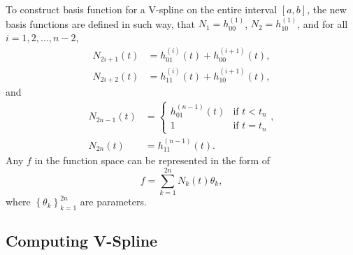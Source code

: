 To construct basis function for a V-spline on the entire interval $[a,b]$, the new basis functions are defined in such way, that $N_1 = h^{(1)}_{00}$, $N_2 = h^{(1)}_{10}$, and for all $i=1,2,\ldots,n-2$, 
\begin{align}
N_{2i+1}(t)&=h_{01}^{(i)}(t)+h_{00}^{(i+1)}(t), \\
N_{2i+2}(t)&= h_{11}^{(i)}(t)+h_{10}^{(i+1)}(t),
\end{align}
and
\begin{align}
N_{2n-1}(t) &= 
\begin{cases}
h_{01}^{(n-1)}(t) & \mbox{if $t<t_n$}\\ 
1 & \mbox{if $t=t_n$}
\end{cases},\\
N_{2n}(t) &= h_{11}^{(n-1)}(t).
\end{align}
Any $f$ in the function space can be represented in the form of
\begin{equation}
f=\sum_{k=1}^{2n}N_k(t)\theta_k,
\end{equation}
where $\left\lbrace \theta_k\right\rbrace_{k=1}^{2n}$ are parameters.





\subsection{Computing V-Spline}

